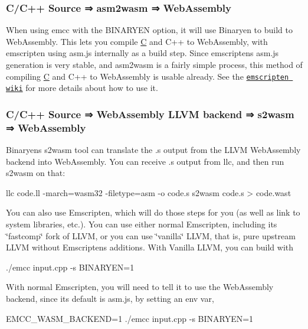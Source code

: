 \subsubsection*{C/\+C++ Source ⇒ asm2wasm ⇒ Web\+Assembly}

When using {\ttfamily emcc} with the {\ttfamily B\+I\+N\+A\+R\+Y\+EN} option, it will use Binaryen to build to Web\+Assembly. This lets you compile \mbox{\hyperlink{struct_c}{C}} and C++ to Web\+Assembly, with emscripten using asm.\+js internally as a build step. Since emscripten\textquotesingle{}s asm.\+js generation is very stable, and asm2wasm is a fairly simple process, this method of compiling \mbox{\hyperlink{struct_c}{C}} and C++ to Web\+Assembly is usable already. See the \href{https://github.com/kripken/emscripten/wiki/WebAssembly}{\tt emscripten wiki} for more details about how to use it.

\subsubsection*{C/\+C++ Source ⇒ Web\+Assembly L\+L\+VM backend ⇒ s2wasm ⇒ Web\+Assembly}

Binaryen\textquotesingle{}s {\ttfamily s2wasm} tool can translate the {\ttfamily .s} output from the L\+L\+VM Web\+Assembly backend into Web\+Assembly. You can receive {\ttfamily .s} output from {\ttfamily llc}, and then run {\ttfamily s2wasm} on that\+:


\begin{DoxyCode}
llc code.ll -march=wasm32 -filetype=asm -o code.s
s2wasm code.s > code.wast
\end{DoxyCode}


You can also use Emscripten, which will do those steps for you (as well as link to system libraries, etc.). You can use either normal Emscripten, including it\textquotesingle{}s \char`\"{}fastcomp\char`\"{} fork of L\+L\+VM, or you can use \char`\"{}vanilla\char`\"{} L\+L\+VM, that is, pure upstream L\+L\+VM without Emscripten\textquotesingle{}s additions. With Vanilla L\+L\+VM, you can build with


\begin{DoxyCode}
./emcc input.cpp -s BINARYEN=1
\end{DoxyCode}


With normal Emscripten, you will need to tell it to use the Web\+Assembly backend, since its default is asm.\+js, by setting an env var,


\begin{DoxyCode}
EMCC\_WASM\_BACKEND=1 ./emcc input.cpp -s BINARYEN=1
\end{DoxyCode}



